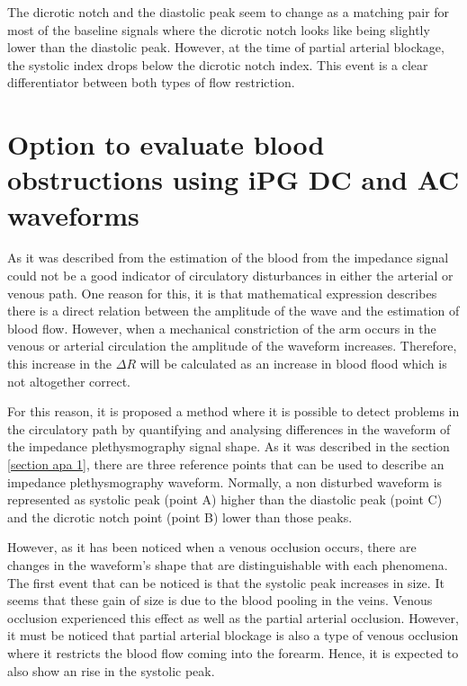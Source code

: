 The dicrotic notch and the diastolic peak seem to change as a matching pair for most of the baseline signals where the dicrotic notch looks like being slightly lower than the diastolic peak. However, at the time of partial arterial blockage, the systolic index drops below the dicrotic notch index. This event is a clear differentiator between both types of flow restriction.

\section{Option to evaluate blood obstructions using iPG DC and AC waveforms}  %
\label{section discussion 5}
As it was described from the estimation of the blood from the impedance signal could not be a good indicator of circulatory disturbances in either the arterial or venous path. One reason for this, it is that mathematical expression describes there is a direct relation between the amplitude of the wave and the estimation of blood flow. However, when a mechanical constriction of the arm occurs in the venous or arterial circulation the amplitude of the waveform increases. Therefore, this increase in the $\Delta R$ will be calculated as an increase in blood flood which is not altogether correct. 

For this reason, it is proposed a method where it is possible to detect problems in the circulatory path by quantifying and analysing differences in the waveform of the impedance plethysmography signal shape. As it was described in the section \ref{section apa 1}, there are three reference points that can be used to describe an impedance plethysmography waveform. Normally, a non disturbed waveform is represented as systolic peak (point A) higher than the diastolic peak (point C) and the dicrotic notch point (point B) lower than those peaks. 

However, as it has been noticed when a venous occlusion occurs, there are changes in the waveform's shape that are distinguishable with each phenomena. The first event that can be noticed is that the systolic peak increases in size. It seems that these gain of size is due to the blood pooling in the veins. Venous occlusion experienced this effect as well as the partial arterial occlusion. However, it must be noticed that partial arterial blockage is also a type of venous occlusion where it restricts the blood flow coming into the forearm. Hence, it is expected to also show an rise in the systolic peak. 

